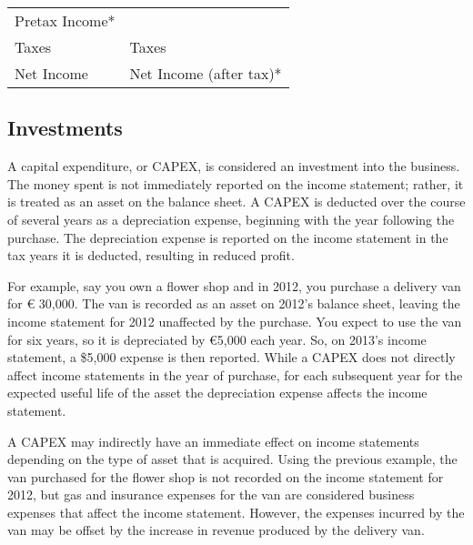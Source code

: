 \documentclass[]{book}
\newcommand{\euro}{€}
\theoremstyle{definition}
\theoremstyle{definition}
\theoremstyle{definition}
\theoremstyle{remark}
\begin{document}
\begin{longtable}[]{@{}ll@{}}
\begin{minipage}[t]{0.18\columnwidth}
Pretax Income*\strut
\end{minipage}\tabularnewline
\begin{minipage}[t]{0.18\columnwidth}\raggedright\strut
Taxes\strut
\end{minipage} & \begin{minipage}[t]{0.18\columnwidth}\raggedright\strut
Taxes\strut
\end{minipage}\tabularnewline
\begin{minipage}[t]{0.18\columnwidth}\raggedright\strut
Net Income\strut
\end{minipage} & \begin{minipage}[t]{0.18\columnwidth}\raggedright\strut
Net Income (after tax)*\strut
\end{minipage}\tabularnewline
\bottomrule
\end{longtable}

\subsection{Investments}\label{investments}

A capital expenditure, or CAPEX, is considered an investment into the
business. The money spent is not immediately reported on the income
statement; rather, it is treated as an asset on the balance sheet. A
CAPEX is deducted over the course of several years as a depreciation
expense, beginning with the year following the purchase. The
depreciation expense is reported on the income statement in the tax
years it is deducted, resulting in reduced profit.

For example, say you own a flower shop and in 2012, you purchase a
delivery van for \euro{} 30,000. The van is recorded as an asset on
2012's balance sheet, leaving the income statement for 2012 unaffected
by the purchase. You expect to use the van for six years, so it is
depreciated by \euro{}5,000 each year. So, on 2013's income statement, a
\$5,000 expense is then reported. While a CAPEX does not directly affect
income statements in the year of purchase, for each subsequent year for
the expected useful life of the asset the depreciation expense affects
the income statement.

A CAPEX may indirectly have an immediate effect on income statements
depending on the type of asset that is acquired. Using the previous
example, the van purchased for the flower shop is not recorded on the
income statement for 2012, but gas and insurance expenses for the van
are considered business expenses that affect the income statement.
However, the expenses incurred by the van may be offset by the increase
in revenue produced by the delivery van.
\end{document}
